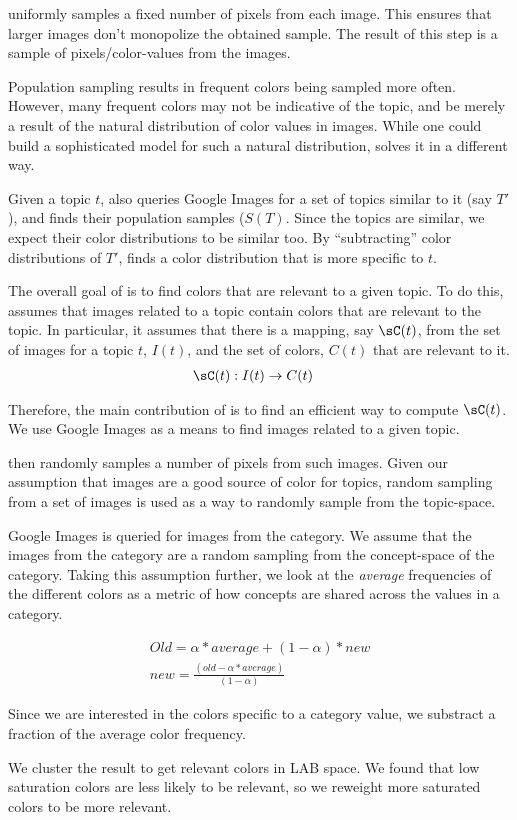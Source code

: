 \system uniformly samples a fixed number of pixels from each image. This ensures that larger images don't monopolize the obtained sample. The result of this step is a sample of pixels/color-values from the images.

Population sampling results in frequent colors being sampled more often. However, many frequent colors may not be indicative of the topic, and be merely a result of the natural distribution of color values in images. While one could build a sophisticated model for such a natural distribution, \system solves it in a different way.

Given a topic $t$, \system also queries Google Images for a set of topics similar to it (say $T'$), and finds their population samples ($S(T)$. Since the topics are similar, we expect their color distributions to be similar too. By ``subtracting'' color distributions of $T'$, \system finds a color distribution that is more specific to $t$. 


The overall goal of \system is to find colors that are relevant to a given topic. To do this, \system assumes that images related to a topic contain colors that are relevant to the topic. In particular, it assumes that there is a mapping, say $\sC(t)$, from the set of images for a topic $t$, $I(t)$, and the set of colors, $C(t)$ that are relevant to it. 
\begin{align*}
\sC(t) : I(t) &\rightarrow C(t)
\end{align*} 

Therefore, the main contribution of \system is to find an efficient way to compute $\sC(t)$. 
We use Google Images as a means to find images related to a given topic. 

\system then randomly samples a number of pixels from such images. Given our assumption that images are a good source of color for topics, random sampling from a set of images is used as a way to randomly sample from the topic-space.   

Google Images is queried for images from  the category.
We assume that the images from the category are a random sampling from the concept-space of the category. Taking this assumption further, we look at the {\em average} frequencies of the different colors as a metric of how concepts are shared across the values in a category.

\begin{align}
Old = \alpha*average + (1-\alpha)*new \\
  new = \frac{(old - \alpha*average)}{(1-\alpha)} 
\end{align}

Since we are interested in the colors specific to a category value, we substract a fraction of the average color frequency. 

We cluster the result to get relevant colors in LAB space. We found that low saturation colors are less likely to be relevant, 
so we reweight more saturated colors to be more relevant.
